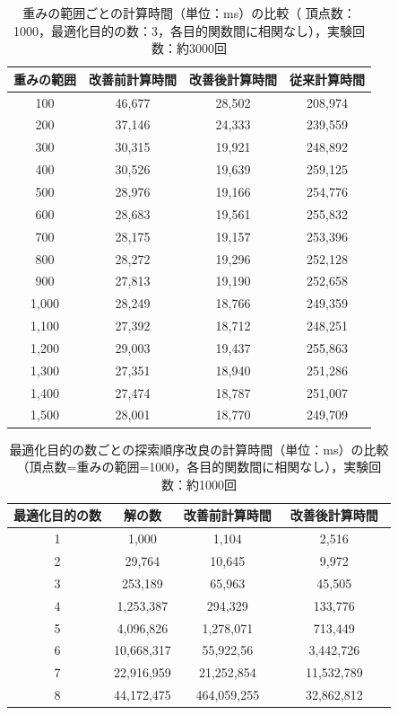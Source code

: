 \documentclass[12pt]{optlab-bachelor}
\begin{document}
\begin{table}[h]
  \centering
  \caption{重みの範囲ごとの計算時間（単位：ms）の比較（
  頂点数：1000，最適化目的の数：3，各目的関数間に相関なし），実験回数：約3000回}
  {\small
  \begin{tabular}{|c|c|c|c|} \hline
    重みの範囲 & 改善前計算時間 & 改善後計算時間 & 従来計算時間 \\ \hline
    100 & 46,677 & 28,502 & 208,974 \\ \hline
    200 & 37,146 & 24,333 & 239,559 \\ \hline
    300 & 30,315 & 19,921 & 248,892 \\ \hline
    400 & 30,526 & 19,639 & 259,125 \\ \hline
    500 & 28,976 & 19,166 & 254,776 \\ \hline
    600 & 28,683 & 19,561 & 255,832 \\ \hline
    700 & 28,175 & 19,157 & 253,396 \\ \hline
    800 & 28,272 & 19,296 & 252,128 \\ \hline
    900 & 27,813 & 19,190 & 252,658 \\ \hline
    1,000 & 28,249 & 18,766 & 249,359 \\ \hline
    1,100 & 27,392 & 	18,712 & 	248,251 \\ \hline
    1,200 & 29,003 & 	19,437	 & 255,863 \\ \hline
    1,300 & 27,351 & 	18,940 & 	251,286 \\ \hline
    1,400 & 27,474 & 	18,787 & 	251,007 \\ \hline
    1,500 & 28,001 & 	18,770 & 	249,709 \\ \hline
  \end{tabular}
  }
\end{table}

\begin{table}[h]
  \centering
  \caption{最適化目的の数ごとの探索順序改良の計算時間（単位：ms）の比較（頂点数=重みの範囲=1000，各目的関数間に相関なし），実験回数：約1000回}
  {\small
  \begin{tabular}{|c|c|c|c|} \hline
    最適化目的の数 & 解の数 & 改善前計算時間 & 改善後計算時間　\\ \hline
    1 & 	1,000 & 	1,104 & 	2,516　\\ \hline
    2 & 	29,764	 & 10,645 & 	9,972　\\ \hline
    3 & 	253,189	 & 65,963 & 	45,505　\\ \hline
    4 & 	1,253,387	 & 294,329	 & 133,776　\\ \hline
    5 & 	4,096,826	 & 1,278,071	 & 713,449　\\ \hline
    6 &   10,668,317    &	55,922,56 &	3,442,726 \\ \hline
    7 &   22,916,959   &	21,252,854 &	11,532,789 \\ \hline
    8 &   44,172,475   &	464,059,255 &	32,862,812 \\ \hline
  \end{tabular}
  }
\end{table}
\end{document}
